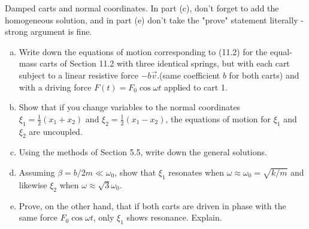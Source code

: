 \documentclass[11pt,letterpaper,boxed]{../hmcpsetrhino}
\newcommand{\half}{\frac{1}{2}}
\begin{document}
\newpage


\begin{problem}[iii]
Damped carts and normal coordinates. In part (c), don't forget to add the homogeneous solution, and in part (e) don't take the "prove" statement literally - strong argument is fine.

\begin{problem}
\begin{enumerate}[(a)]
\item Write down the equations of motion corresponding to (11.2) for the equal-mass carts of Section 11.2 with three identical springs, but with each cart subject to a linear resistive force $-b\vec v$.(same coefficient $b$ for both carts) and with a driving force $F(t) = F_0 \cos \omega t$ applied to cart 1.

\item Show that if you change variables to the normal coordinates $\xi_1 = \half (x_1 + x_2)$ and $\xi_2 = \half (x_1 - x_2)$, the equations of motion for $\xi_1$ and $\xi_2$ are uncoupled.

\item Using the methods of Section 5.5, write down the general solutions. 

\item Assuming $\beta = b/2m \ll \omega_0$, show that $\xi_1$ resonates when $\omega \approx \omega_0 = \sqrt{k /m}$ and likewise $\xi_2$ when $\omega \approx \sqrt{3} \omega_0$. 

\item Prove, on the other hand, that if both carts are driven in phase with the same force $F_0 \cos \omega t$, only $\xi_1$ shows resonance. Explain.

\end{enumerate}
\end{problem}
\end{problem}
\begin{solution}


\vfill
\end{solution}

\newpage
\end{document}
